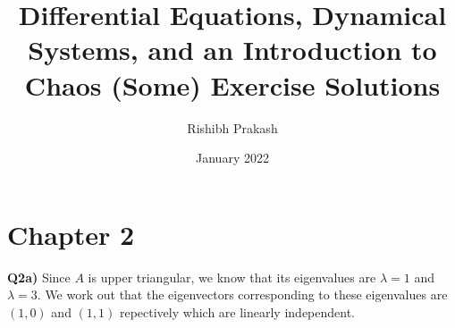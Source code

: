 \documentclass{article}
\title{Differential Equations, Dynamical Systems, and an Introduction to Chaos (Some) Exercise Solutions}
\author{Rishibh Prakash}
\date{January 2022}
\begin{document}
\maketitle

\section{Chapter 2}
\textbf{Q2a)} Since $A$ is upper triangular, we know that its eigenvalues are $\lambda = 1$ and $\lambda = 3$. We work out that the eigenvectors corresponding to these eigenvalues are $(1, 0)$ and $(1, 1)$ repectively which are linearly independent.
\end{document}
